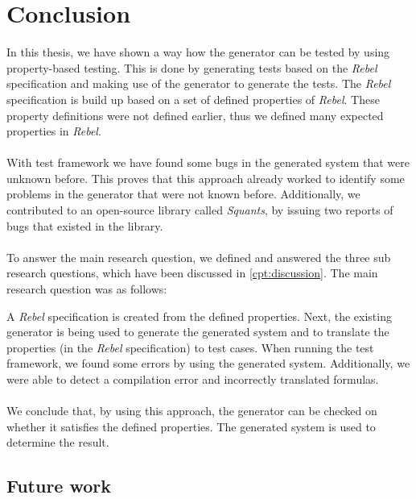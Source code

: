 \chapter{Conclusion}
\label{cpt:conclusion}
In this thesis, we have shown a way how the generator can be tested by using property-based testing. This is done by generating tests based on the \textit{Rebel} specification and making use of the generator to generate the tests. The \textit{Rebel} specification is build up based on a set of defined properties of \textit{Rebel}. These property definitions were not defined earlier, thus we defined many expected properties in \textit{Rebel}.\\
\\
With test framework we have found some bugs in the generated system that were unknown before. This proves that this approach already worked to identify some problems in the generator that were not known before. Additionally, we contributed to an open-source library called \textit{Squants}, by issuing two reports of bugs that existed in the library.\\
\\
To answer the main research question, we defined and answered the three sub research questions, which have been discussed in \autoref{cpt:discussion}. The main research question was as follows:
\begin{quote}
\rqMain
\end{quote}
A \textit{Rebel} specification is created from the defined properties. Next, the existing generator is being used to generate the generated system and to translate the properties (in the \textit{Rebel} specification) to test cases. When running the test framework, we found some errors by using the generated system. Additionally, we were able to detect a compilation error and incorrectly translated formulas.\\
\\
We conclude that, by using this approach, the generator can be checked on whether it satisfies the defined properties. The generated system is used to determine the result.

\section{Future work}

